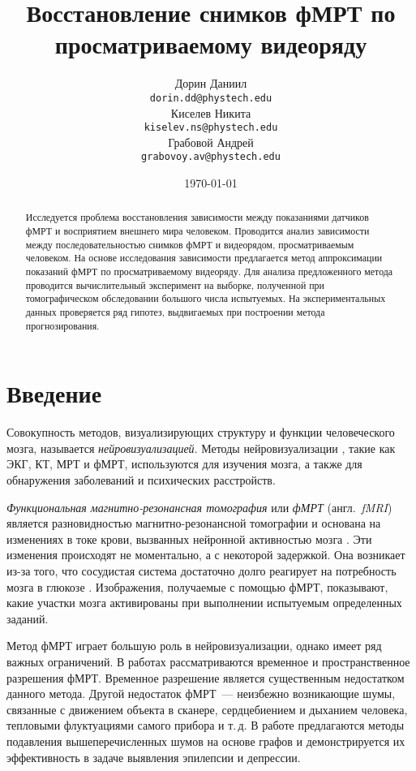 \documentclass[a4paper, 12pt]{extarticle}
\title{Восстановление снимков фМРТ по просматриваемому видеоряду}
\author{
	Дорин Даниил \\
	\texttt{dorin.dd@phystech.edu} \\
	\And
	Киселев Никита \\
	\texttt{kiselev.ns@phystech.edu} \\
	\And
	Грабовой Андрей \\
	\texttt{grabovoy.av@phystech.edu}
}
\date{\today}
\begin{document}
\maketitle

\begin{abstract}

	Исследуется проблема восстановления зависимости между показаниями датчиков фМРТ
	и восприятием внешнего мира человеком.
	Проводится анализ зависимости между последовательностью снимков фМРТ и видеорядом,
	просматриваемым человеком.
	На основе исследования зависимости предлагается метод аппроксимации показаний фМРТ по
	просматриваемому видеоряду.
	Для анализа предложенного метода проводится вычислительный эксперимент на
	выборке, полученной при томографическом обследовании большого числа испытуемых.
	На экспериментальных данных проверяется ряд гипотез, выдвигаемых при построении
	метода прогнозирования.

\end{abstract}



\section{Введение}

Совокупность методов, визуализирующих структуру и функции человеческого мозга,
называется \textit{нейровизуализацией}. Методы нейровизуализации \citep{puras2014neurovisualization}, такие как ЭКГ, КТ, МРТ и фМРТ,
используются для изучения мозга, а также для обнаружения заболеваний и психических расстройств.

\textit{Функциональная магнитно-резонансная томография} или \textit{фМРТ} (англ.~\textit{fMRI})
является разновидностью магнитно-резонансной томографии и основана на изменениях в токе крови,
вызванных нейронной активностью мозга \citep{Glover2011}.
Эти изменения происходят не моментально, а с некоторой задержкой.
Она возникает из-за того, что сосудистая система достаточно долго реагирует
на потребность мозга в глюкозе \citep{Logothetis2003}. Изображения, получаемые с помощью фМРТ,
показывают, какие участки мозга активированы при выполнении испытуемым определенных заданий.

Метод фМРТ играет большую роль в нейровизуализации, однако имеет ряд важных ограничений.
В работах \citep{menon1999spatial, logothetis2008we} рассматриваются
временное и пространственное разрешения фМРТ. Временное разрешение является существенным
недостатком данного метода. Другой недостаток фМРТ~--- неизбежно возникающие шумы,
связанные с движением объекта в сканере, сердцебиением и дыханием человека, тепловыми
флуктуациями самого прибора и т.\,д. В работе \citep{1804.10167} предлагаются методы
подавления вышеперечисленных шумов на основе графов и демонстрируется их эффективность в задаче
выявления эпилепсии и депрессии.
\end{document}
